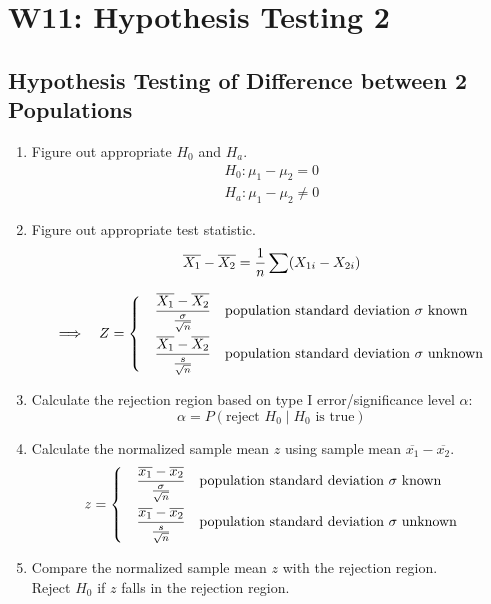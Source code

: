 \documentclass[a4paper]{article}
\begin{document}
\section{W11: Hypothesis Testing 2}
\subsection{Hypothesis Testing of Difference between 2 Populations}
\begin{enumerate}
    \item Figure out appropriate $H_{0}$ and $H_{a}$.
    \begin{align*}
        H_{0}: \mu_{1}-\mu_{2} = 0\\
        H_{a}: \mu_{1}-\mu_{2} \neq 0
    \end{align*}
    \item Figure out appropriate test statistic.
    $$
    \begin{array}{cc}
    \displaystyle \overline{X_{1}}-\overline{X_{2}} = \frac{1}{n}\sum (X_{1i}-X_{2i})
    \mbox{}\\
    \\
    \Longrightarrow \quad Z =
    \begin{dcases}
    \quad \frac{\overline{X_{1}}-\overline{X_{2}}}{\frac{\sigma}{\sqrt{n}}} &\mbox{population standard deviation $\sigma$ known}\\
    \quad \frac{\overline{X_{1}}-\overline{X_{2}}}{\frac{s}{\sqrt{n}}} &\mbox{population standard deviation $\sigma$ unknown}
    \end{dcases}
    \end{array}
    $$
    \item Calculate the rejection region based on type I error/significance level $\alpha$:
     $$\alpha = P(\text{reject }H_{0}\mid H_{0}\text{ is true})$$
     \item Calculate the normalized sample mean $z$ using sample mean $\overline{x_{1}}-\overline{x_{2}}$.
     $$
     z =
    \begin{dcases}
    \quad \frac{\overline{x_{1}}-\overline{x_{2}}}{\frac{\sigma}{\sqrt{n}}} &\mbox{population standard deviation $\sigma$ known}\\
    \quad \frac{\overline{x_{1}}-\overline{x_{2}}}{\frac{s}{\sqrt{n}}} &\mbox{population standard deviation $\sigma$ unknown}
    \end{dcases}
    $$
    \item Compare the normalized sample mean $z$ with the rejection region.\\Reject $H_{0}$ if $z$ falls in the rejection region. 

\end{enumerate}
\end{document}
